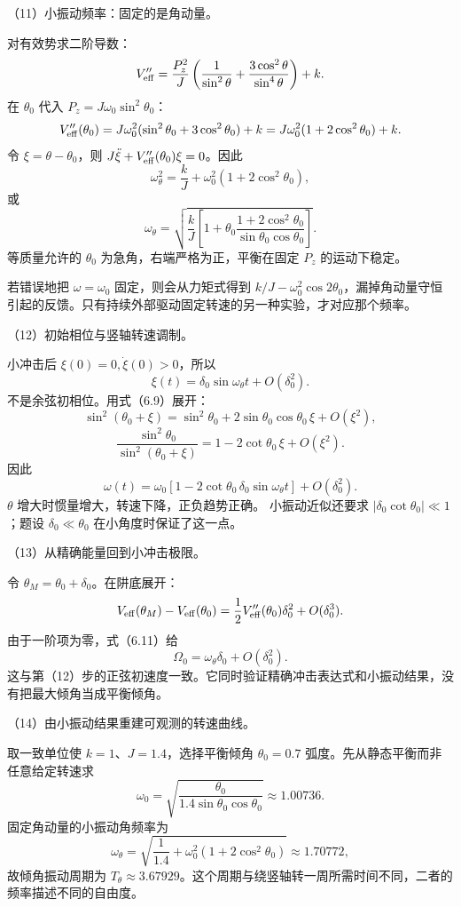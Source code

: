 \documentclass[12pt,a4paper,fontset=fandol]{ctexart}
\begin{document}
（11）小振动频率：固定的是角动量。

对有效势求二阶导数： \[
V_{\rm eff}''=
\frac{P_z^2}{J}
\left(\frac1{\sin^2\theta}
+\frac{3\cos^2\theta}{\sin^4\theta}\right)+k.
\] 在 \(\theta_0\) 代入 \(P_z=J\omega_0\sin^2\theta_0\)： \[
V_{\rm eff}''(\theta_0)
=J\omega_0^2(\sin^2\theta_0+3\cos^2\theta_0)+k
=J\omega_0^2(1+2\cos^2\theta_0)+k.
\] 令 \(\xi=\theta-\theta_0\)，则
\(J\ddot\xi+V_{\rm eff}''(\theta_0)\xi=0\)。因此 \[
\boxed{\omega_\theta^2=
\frac{k}{J}+\omega_0^2(1+2\cos^2\theta_0),}\tag{6.12}
\] 或 \[
\boxed{\omega_\theta=
\sqrt{\frac{k}{J}
\left[1+\theta_0
\frac{1+2\cos^2\theta_0}{\sin\theta_0\cos\theta_0}
\right]}.}\tag{6.13}
\] 等质量允许的 \(\theta_0\) 为急角，右端严格为正，平衡在固定 \(P_z\)
的运动下稳定。

若错误地把 \(\omega=\omega_0\) 固定，则会从力矩式得到
\(k/J-\omega_0^2\cos2\theta_0\)，漏掉角动量守恒引起的反馈。只有持续外部驱动固定转速的另一种实验，才对应那个频率。

（12）初始相位与竖轴转速调制。

小冲击后 \(\xi(0)=0,\dot\xi(0)>0\)，所以 \[
\xi(t)=\delta_0\sin\omega_\theta t+O(\delta_0^2).
\] 不是余弦初相位。用式（6.9）展开： \[
\sin^2(\theta_0+\xi)
=\sin^2\theta_0+2\sin\theta_0\cos\theta_0\,\xi+O(\xi^2),
\] \[
\frac{\sin^2\theta_0}{\sin^2(\theta_0+\xi)}
=1-2\cot\theta_0\,\xi+O(\xi^2).
\] 因此 \[
\boxed{\omega(t)=
\omega_0[1-2\cot\theta_0\,\delta_0\sin\omega_\theta t]
+O(\delta_0^2).}\tag{6.14}
\] \(\theta\) 增大时惯量增大，转速下降，正负趋势正确。 小振动近似还要求
\(|\delta_0\cot\theta_0|\ll1\)；题设 \(\delta_0\ll\theta_0\)
在小角度时保证了这一点。

（13）从精确能量回到小冲击极限。

令 \(\theta_M=\theta_0+\delta_0\)。在阱底展开： \[
V_{\rm eff}(\theta_M)-V_{\rm eff}(\theta_0)
=\frac12V_{\rm eff}''(\theta_0)\delta_0^2+O(\delta_0^3).
\] 由于一阶项为零，式（6.11）给 \[
\Omega_0=\omega_\theta\delta_0+O(\delta_0^2).
\]
这与第（12）步的正弦初速度一致。它同时验证精确冲击表达式和小振动结果，没有把最大倾角当成平衡倾角。

（14）由小振动结果重建可观测的转速曲线。

取一致单位使 \(k=1\)、\(J=1.4\)，选择平衡倾角 \(\theta_0=0.7\)
弧度。先从静态平衡而非任意给定转速求 \[
\omega_0=\sqrt{\frac{\theta_0}{1.4\sin\theta_0\cos\theta_0}}
\approx1.00736.
\] 固定角动量的小振动角频率为 \[
\omega_\theta
=\sqrt{\frac1{1.4}+\omega_0^2(1+2\cos^2\theta_0)}
\approx1.70772,
\] 故倾角振动周期为
\(T_\theta\approx3.67929\)。这个周期与绕竖轴转一周所需时间不同，二者的频率描述不同的自由度。
\end{document}
